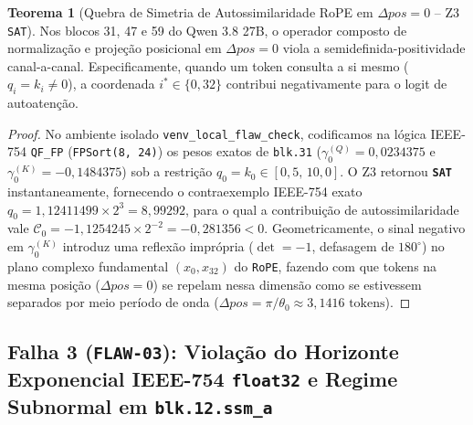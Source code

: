 \documentclass[11pt,a4paper]{article}
\theoremstyle{definition}
\newtheorem{theorem}{Teorema}
\begin{document}
\begin{theorem}[Quebra de Simetria de Autossimilaridade RoPE em $\Delta pos = 0$ -- Z3 \texttt{SAT}]
Nos blocos 31, 47 e 59 do Qwen 3.8 27B, o operador composto de normalização e projeção posicional em $\Delta pos = 0$ viola a semidefinida-positividade canal-a-canal. Especificamente, quando um token consulta a si mesmo ($q_i = k_i \neq 0$), a coordenada $i^* \in \{0, 32\}$ contribui negativamente para o logit de autoatenção.
\end{theorem}

\begin{proof}
No ambiente isolado \texttt{venv\_local\_flaw\_check}, codificamos na lógica IEEE-754 \texttt{QF\_FP} (\texttt{FPSort(8, 24)}) os pesos exatos de \texttt{blk.31} ($\gamma_0^{(Q)} = 0{,}0234375$ e $\gamma_0^{(K)} = -0{,}1484375$) sob a restrição $q_0 = k_0 \in [0{,}5,\, 10{,}0]$. O Z3 retornou \textbf{\texttt{SAT}} instantaneamente, fornecendo o contraexemplo IEEE-754 exato $q_0 = 1{,}12411499 \times 2^3 = 8{,}99292$, para o qual a contribuição de autossimilaridade vale $\mathcal{C}_0 = -1{,}1254245 \times 2^{-2} = -0{,}281356 < 0$. Geometricamente, o sinal negativo em $\gamma_0^{(K)}$ introduz uma reflexão imprópria ($\det = -1$, defasagem de $180^\circ$) no plano complexo fundamental $(x_0, x_{32})$ do \texttt{RoPE}, fazendo com que tokens na mesma posição ($\Delta pos = 0$) se repelam nessa dimensão como se estivessem separados por meio período de onda ($\Delta pos = \pi / \theta_0 \approx 3{,}1416\text{ tokens}$). \qedhere
\end{proof}

\subsection{Falha 3 (\texttt{FLAW-03}): Violação do Horizonte Exponencial IEEE-754 \texttt{float32} e Regime Subnormal em \texttt{blk.12.ssm\_a}}
\end{document}
